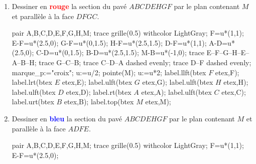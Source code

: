 \begin{exercice*}[Quadrillage]
    \begin{enumerate}
        \item Dessiner en \textcolor{red}{\textbf{rouge}} la section du pavé $ABCDEHGF$ par le plan contenant $M$ et parallèle à la face $DFGC$.
        \begin{center}           
            \begin{Geometrie}[CoinBG={(.5u,.5u)},CoinHD={(5u,4u)}]
                pair A,B,C,D,E,F,G,H,M;
                trace grille(0.5) withcolor LightGray;
                F=u*(1,1);
                E-F=u*(2.5,0);
                G-F=u*(0,1.5);
                H-F=u*(2.5,1.5);
                D-F=u*(1,1);
                A-D=u*(2.5,0);
                C-D=u*(0,1.5);
                B-D=u*(2.5,1.5);
                M-B=u*(-1,0);
                trace E--F--G--H--E--A--B--H;
                trace G--C--B;
                trace C--D--A dashed evenly;
                trace D--F dashed evenly;
                marque_p:="croix";
                u:=u/2;
                pointe(M);
                u:=u*2;
                label.llft(btex $F$ etex,F);
                label.lrt(btex $E$ etex,E);
                label.ulft(btex $G$ etex,G);
                label.ulft(btex $H$ etex,H);
                label.ulft(btex $D$ etex,D);
                label.rt(btex $A$ etex,A);
                label.ulft(btex $C$ etex,C);
                label.urt(btex $B$ etex,B);
                label.top(btex $M$ etex,M);
            \end{Geometrie}
        \end{center}
        \item Dessiner en \textcolor{blue}{\textbf{bleu}} la section du pavé $ABCDEHGF$ par le plan contenant $M$ et parallèle à la face $ADFE$.
        \begin{center}           
            \begin{Geometrie}[CoinBG={(.5u,.5u)},CoinHD={(5u,4u)}]
                pair A,B,C,D,E,F,G,H,M;
                trace grille(0.5) withcolor LightGray;
                F=u*(1,1);
                E-F=u*(2.5,0);

\end{Geometrie}
\end{center}
\end{enumerate}
\end{exercice*}
